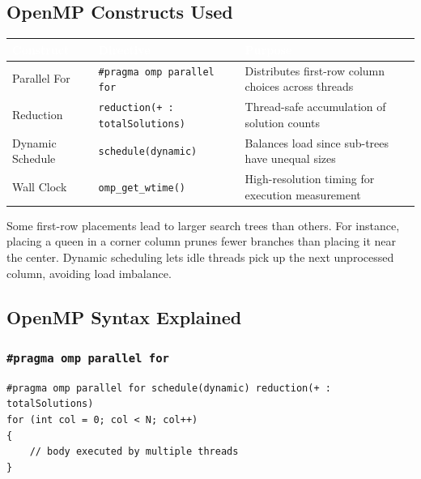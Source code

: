 \documentclass[11pt]{article}
\begin{document}
\subsection{OpenMP Constructs Used}

\begin{center}
\sffamily\small
\begin{tabular}{@{}llp{7.5cm}@{}}
\toprule
\rowcolor{tableheader}
\textcolor{white}{\textbf{Construct}} & \textcolor{white}{\textbf{Directive}} & \textcolor{white}{\textbf{Purpose}} \\
\midrule
\rowcolor{rowalt}
Parallel For & \texttt{\#pragma omp parallel for} & Distributes first-row column choices across threads \\
Reduction & \texttt{reduction(+ : totalSolutions)} & Thread-safe accumulation of solution counts \\
\rowcolor{rowalt}
Dynamic Schedule & \texttt{schedule(dynamic)} & Balances load since sub-trees have unequal sizes \\
Wall Clock & \texttt{omp\_get\_wtime()} & High-resolution timing for execution measurement \\
\bottomrule
\end{tabular}
\end{center}

\begin{shadedbox}
Some first-row placements lead to larger search trees than others. For instance, placing a queen in a corner column prunes fewer branches than placing it near the center. Dynamic scheduling lets idle threads pick up the next unprocessed column, avoiding load imbalance.
\end{shadedbox}

\subsection{OpenMP Syntax Explained}

\subsubsection{\texttt{\#pragma omp parallel for}}

\begin{codebox}
\begin{lstlisting}
#pragma omp parallel for schedule(dynamic) reduction(+ : totalSolutions)
for (int col = 0; col < N; col++)
{
    // body executed by multiple threads
}
\end{lstlisting}
\end{codebox}
\end{document}
